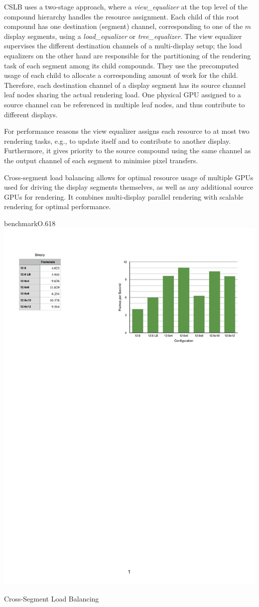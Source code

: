 CSLB uses a two-stage approach, where a {\em view\_equalizer} at the top level
of the compound hierarchy handles the resource assignment. Each child of this
root compound has one destination (segment) channel, corresponding to one of
the $m$ display segments, using a {\em load\_equalizer} or {\em
tree\_equalizer}. The view equalizer supervises the different destination
channels of a multi-display setup; the load equalizers on the other hand are
responsible for the partitioning of the rendering task of each segment among
its child compounds. They use the precomputed usage of each child to allocate a
corresponding amount of work for the child. Therefore, each destination channel
of a display segment has its source channel leaf nodes sharing the actual
rendering load. One physical GPU assigned to a source channel can be referenced
in multiple leaf nodes, and thus contribute to different displays.

For performance reasons the view equalizer assigns each resource to at most two
rendering tasks, e.g., to update itself and to contribute to another display.
Furthermore, it gives priority to the source compound using the same channel as
the output channel of each segment to minimise pixel transfers.

Cross-segment load balancing allows for optimal resource usage of multiple
GPUs used for driving the display segments themselves, as well as any additional
source GPUs for rendering. It combines multi-display parallel rendering with
scalable rendering for optimal performance.

\begin{wrapfloat}{benchmark}{O}{.618\textwidth}
  \includegraphics[width=.618\textwidth]{results/cslbFPS}
  \caption{\label{rCSLBFPS}Cross-Segment Load Balancing}
\end{wrapfloat}

